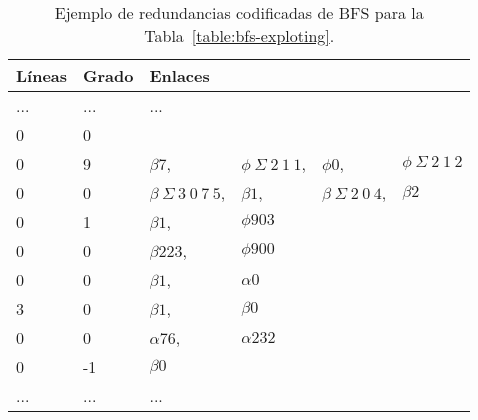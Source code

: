  \begin{table}%
\caption{Ejemplo de redundancias codificadas de BFS para la Tabla~\ref{table:bfs-exploting}.}
\label{table:bfs-exploted}
\centering
\footnotesize

\begin{tabular}{|l|l|llll|}
	\toprule
	Líneas & Grado & \multicolumn{3}{l}{Enlaces} &  \\
	\midrule
	... & ... & ... & & &  \\
	0 & 0 & & & & \\
	0 & 9 & $\beta7$, & $\phi\:\Sigma\:2\:1\:1$, & $\phi0$, & $\phi\:\Sigma\:2\:1\:2$ \\
	0 & 0 & $\beta\:\Sigma\:3\:0\:7\:5$, & $\beta1$, & $\beta\:\Sigma\:2\:0\:4$, & $\beta2$ \\
	0 & 1 & $\beta1$, & $\phi903$ & & \\
	0 & 0 & $\beta223$, & $\phi900$ & & \\
	0 & 0 & $\beta1$, & $\alpha0$ & & \\
	3 & 0 & $\beta1$, & $\beta0$ & & \\
	0 & 0 & $\alpha76$, & $\alpha232$ & & \\
	0 & -1 & $\beta0$ & & & \\
	... & ... & ... & & &  \\
\end{tabular}
\end{table} 

